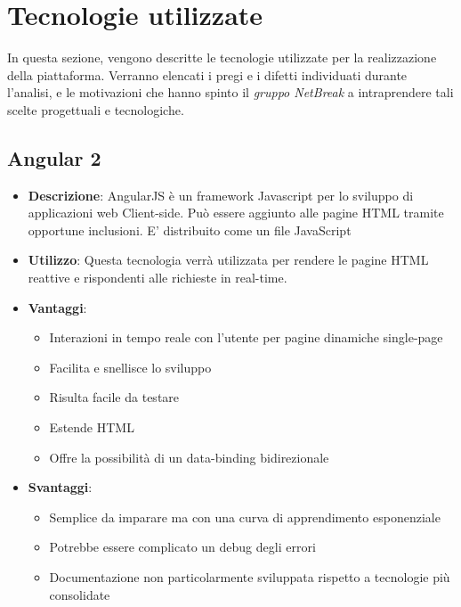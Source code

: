 \newpage
\section{Tecnologie utilizzate}
In questa sezione, vengono descritte le tecnologie utilizzate per la realizzazione della piattaforma. Verranno elencati i pregi e i difetti individuati durante l'analisi, e le motivazioni che hanno spinto il \textit{gruppo NetBreak} a intraprendere tali scelte progettuali e tecnologiche.

\subsection{Angular 2}
\begin{itemize}
	\item \textbf{Descrizione}: AngularJS è un framework Javascript per lo sviluppo di applicazioni web Client-side. Può essere aggiunto alle pagine HTML tramite opportune inclusioni. E' distribuito come un file JavaScript
	\item \textbf{Utilizzo}: Questa tecnologia verrà utilizzata per rendere le pagine HTML reattive e rispondenti alle richieste in real-time.
	\item \textbf{Vantaggi}: 
	\begin{itemize}
		\item Interazioni in tempo reale con l'utente per pagine dinamiche single-page
		\item Facilita e snellisce lo sviluppo
		\item Risulta facile da testare
		\item Estende HTML
		\item Offre la possibilità di un data-binding bidirezionale
	\end{itemize}
	\item \textbf{Svantaggi}:
	\begin{itemize}
		\item Semplice da imparare ma con una curva di apprendimento esponenziale
		\item Potrebbe essere complicato un debug degli errori
		\item Documentazione non particolarmente sviluppata rispetto a tecnologie più consolidate
	\end{itemize}
\end{itemize}

